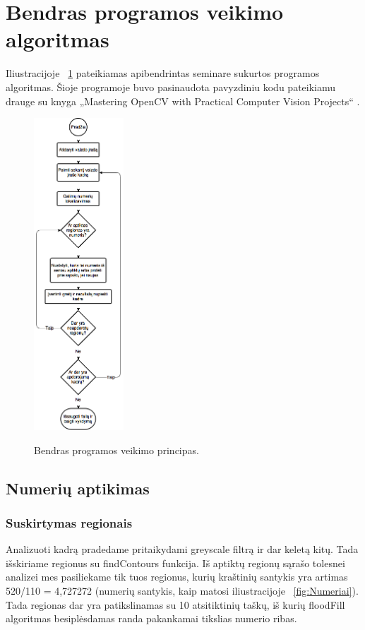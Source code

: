 \documentclass[a4paper,12pt]{article}
\begin{document}
\newpage

\section{Bendras programos veikimo algoritmas}
Iliustracijoje ~\ref{fig:BendrasAlgoritmas} pateikiamas apibendrintas seminare sukurtos programos algoritmas. Šioje programoje buvo pasinaudota pavyzdiniu kodu pateikiamu drauge su knyga „Mastering OpenCV with Practical Computer Vision Projects“ \cite{MasteringOpenCV}.

\begin{figure}[h!]
  \caption{Bendras programos veikimo principas.}
  \centering
    \includegraphics[width=0.3\textwidth]{algo1.png}
  \label{fig:BendrasAlgoritmas}
\end{figure}

\subsection{Numerių aptikimas}

\subsubsection{Suskirtymas regionais}
Analizuoti kadrą pradedame pritaikydami greyscale filtrą ir dar keletą kitų. Tada išskiriame regionus su findContours funkcija. Iš aptiktų regionų sąrašo tolesnei analizei mes pasiliekame tik tuos regionus, kurių kraštinių santykis yra artimas 520/110 = 4,727272 (numerių santykis, kaip matosi iliustracijoje ~\ref{fig:Numeriai}). Tada regionas dar yra patikslinamas su 10 atsitiktinių taškų, iš kurių floodFill algoritmas besiplėsdamas randa pakankamai tikslias numerio ribas.
\end{document}
